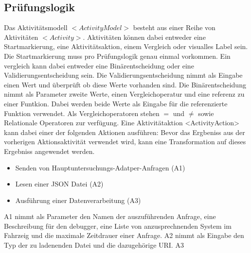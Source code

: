 \documentclass{article}
\begin{document}
    \subsection{Prüfungslogik}
    Das Aktivitätsmodell  $<ActivityModel>$ besteht aus einer Reihe von Aktivitäten $<Activity>$.
    Aktivitäten können dabei entweder eine Startmarkierung, eine Aktivitätsaktion, einem Vergleich oder visualles Label sein.
    Die Startmarkierung muss pro Prüfungslogik genau einmal vorkommen.
    Ein vergleich kann dabei entweder eine Binärentscheidung oder eine Validierungsentscheidung sein.   
    Die Validierungsentscheidung nimmt als Eingabe einen Wert und überprüft ob diese Werte vorhanden sind.
    Die Binärentscheidung nimmt als Parameter zweite Werte, einen Vergleichoperatur und eine referenz zu einer Funtkion. Dabei werden beide Werte als Eingabe für die referenzierte Funktion verwendet.
    Als Vergleichoperatoren stehen $=$ und $\neq$ sowie Relationale Operatoren zur verfügung.
    Eine Aktivitätaktion <ActivityAction> kann dabei einer der folgenden Aktionen ausführen:
    Bevor das Ergbeniss aus der vorherigen Aktionsaktivität verwendet wird, kann eine Transformation auf dieses Ergebniss angewendet werden.
    \begin{itemize}
        \item Senden von Hauptuntersuchungs-Adatper-Anfragen (A1)
        \item Lesen einer JSON Datei (A2)
        \item Ausführung einer Datenverarbeitung (A3)
    \end{itemize}
    A1 nimmt als Parameter den Namen der auszuführenden Anfrage, eine Beschreibung für den debugger, eine Liste von anzusprechnenden System im Fahrzeig und die maximale Zeitdrauer einer Anfrage.
    A2 nimmt als Eingabe den Typ der zu ladenenden Datei und die dazugehörige URI.
    A3\\
\end{document}
